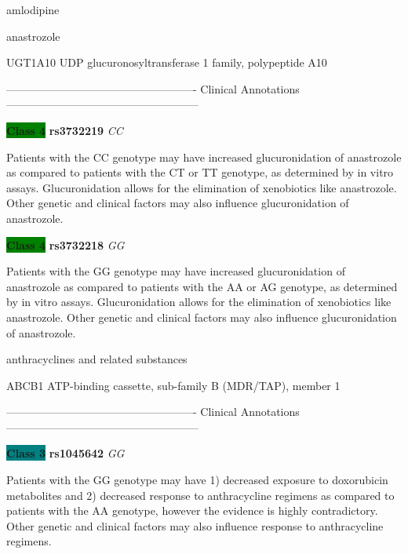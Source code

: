 \documentclass{resume} %
\begin{document}
\begin{rSection}{ amlodipine }
\end{rSection}\begin{rSection}{ anastrozole }
\item[]

\begin{rSubsection}{ UGT1A10 }{ UDP glucuronosyltransferase 1 family, polypeptide A10 }{}{}
\item[]

\item[] ---------------------------------------------------- Clinical Annotations -----------------------------------------------------\newline
\item \textbf{\colorbox{green} {Class 4}} \textbf{ rs3732219 } \textit{ CC }
\item[] Patients with the CC genotype may have increased glucuronidation of anastrozole as compared to patients with the CT or TT genotype, as determined by in vitro assays. Glucuronidation allows for the elimination of xenobiotics like anastrozole. Other genetic and clinical factors may also influence glucuronidation of anastrozole. \item \textbf{\colorbox{green} {Class 4}} \textbf{ rs3732218 } \textit{ GG }
\item[] Patients with the GG genotype may have increased glucuronidation of anastrozole as compared to patients with the AA or AG genotype, as determined by in vitro assays. Glucuronidation allows for the elimination of xenobiotics like anastrozole. Other genetic and clinical factors may also influence glucuronidation of anastrozole.
\end{rSubsection}

\end{rSection}\begin{rSection}{ anthracyclines and related substances }
\item[]

\begin{rSubsection}{ ABCB1 }{ ATP-binding cassette, sub-family B (MDR/TAP), member 1 }{}{}
\item[]

\item[] ---------------------------------------------------- Clinical Annotations -----------------------------------------------------\newline
\item \textbf{\colorbox{teal} {Class 3}} \textbf{ rs1045642 } \textit{ GG }
\item[] Patients with the GG genotype may have 1) decreased exposure to doxorubicin metabolites and 2) decreased response to anthracycline regimens as compared to patients with the AA genotype, however the evidence is highly contradictory. Other genetic and clinical factors may also influence response to anthracycline regimens.
\end{rSubsection}


\end{rSection}
\end{document}
